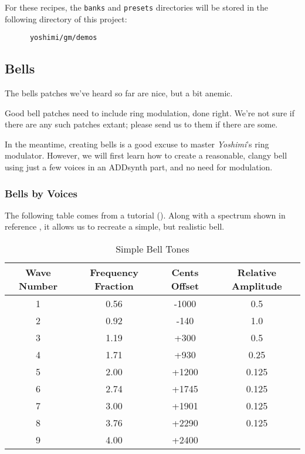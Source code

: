    For these recipes, the \texttt{banks} and \texttt{presets} directories will
   be stored in the following directory of this project:

   \begin{verbatim}
      yoshimi/gm/demos
   \end{verbatim}

\subsection{Bells}
\label{subsec:cookbook_instruments_bells}

   The bells patches we've heard so far are nice, but a bit anemic.
   
   Good bell patches need to include ring modulation, done right.  We're not
   sure if there are any such patches extant; please send us to them if
   there are some.

   In the meantime, creating bells is a good excuse to master
   \textsl{Yoshimi}'s ring modulator.
   However, we will first learn how to create a reasonable, clangy bell
   using just a few voices in an ADDsynth part, and no need for modulation.

\subsubsection{Bells by Voices}
\label{subsec:cookbook_instruments_bells_by_voices}

   The following table comes from a tutorial (\cite{bellsimple}).  Along
   with a spectrum shown in reference \cite{bellspectrum}, it allows us to
   recreate a simple, but realistic bell.

\label{table:simple_bell_tones}
\begin{longtable}{c c c c}
   \caption{Simple Bell Tones} \\
   \hline
      \textbf{Wave Number} &
      \textbf{Frequency Fraction} &
      \textbf{Cents Offset} &
      \textbf{Relative Amplitude} \\
   \hline
   \endfirsthead

   1 &         0.56 &         -1000 &     0.5   \\
   2 &         0.92 &         -140  &     1.0   \\
   3 &         1.19 &         +300  &     0.5   \\
   4 &         1.71 &         +930  &     0.25  \\
   5 &         2.00 &         +1200 &     0.125 \\
   6 &         2.74 &         +1745 &     0.125 \\
   7 &         3.00 &         +1901 &     0.125 \\
   8 &         3.76 &         +2290 &     0.125 \\
   9 &         4.00 &         +2400 &           \\
\end{longtable}

